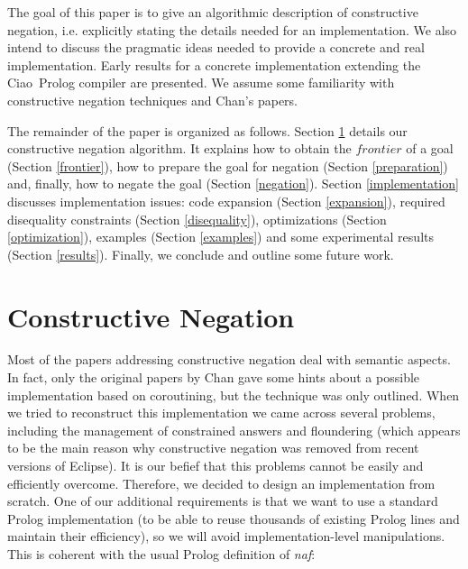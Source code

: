 \documentclass{llncs}
\newcommand{\naf}{{\em naf}}\newcommand{\viejo}[1]{}
\newcommand{\ciao}{Ciao}
\begin{document}
The goal of this paper is to give an algorithmic description of
constructive negation, i.e. explicitly stating the details needed for
an implementation. We also intend to discuss the pragmatic ideas
needed to provide a concrete and real implementation. Early results
for a concrete implementation extending the \ciao\ Prolog compiler are
presented.  We assume some familiarity with constructive negation
techniques and Chan's papers.

The remainder of the paper is organized as follows. Section
\ref{constructive} details our constructive negation algorithm. It
explains how to obtain the $frontier$ of a goal (Section
\ref{frontier}), how to prepare the goal for negation (Section
\ref{preparation}) and, finally, how to negate the goal (Section
\ref{negation}). Section \ref{implementation} discusses implementation
issues: code expansion (Section \ref{expansion}), required disequality
constraints (Section \ref{disequality}), optimizations (Section
\ref{optimization}), examples (Section \ref{examples}) and some
experimental results (Section \ref{results}).  Finally, we conclude
and outline some future work.
 


\section{Constructive Negation}
\label{constructive}

Most of the papers addressing constructive negation deal with semantic
aspects. In fact, only the original papers by Chan gave some hints
about a possible implementation based on coroutining, but the
technique was only outlined. When we tried to reconstruct this
implementation we came across several problems, including the
management of constrained answers and floundering (which appears to be
the main reason why constructive negation was removed from recent
versions of Eclipse). It is our befief that this problems cannot be
easily and efficiently overcome. Therefore, we decided to design an
implementation from scratch.  One of our additional requirements is
that we want to use a standard Prolog implementation (to be able to
reuse thousands of existing Prolog lines and maintain their
efficiency), so we will avoid implementation-level manipulations. This
is coherent with the usual Prolog definition of \naf:
\end{document}
